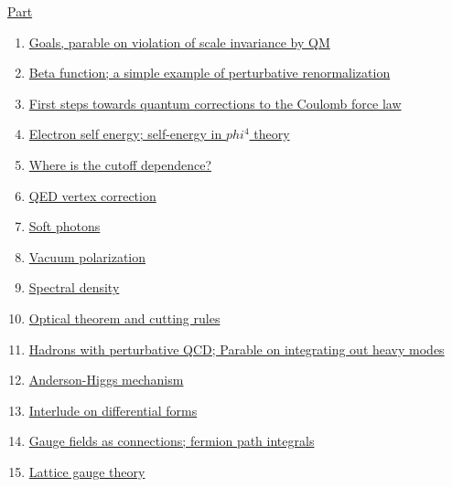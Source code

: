 \documentclass[11pt]{article}
\begin{document}
\newpage 

\begin{center}
	{\large  \href{https://mcgreevy.physics.ucsd.edu/w22/index.html}{Part }}
\end{center}

\vspace{-1cm}

\begin{enumerate}
	\item	\href{https://mp.weixin.qq.com/s/ru78J-IZJXysQjJwDxhlFw}{Goals, parable on violation of scale invariance by QM}	%
	\item	\href{https://mp.weixin.qq.com/s/bhjuN0b_kVqnEr30LZvUkQ}{Beta function; a simple example of perturbative renormalization}	%
	\item	\href{https://mp.weixin.qq.com/s/KhR06IsBpauLIerSNJc9rQ}{First steps towards quantum corrections to the Coulomb force law} 	%
	\item 	\href{https://mp.weixin.qq.com/s/ud2lzP8oh2rVSIzDwNTEBA}{Electron self energy; self-energy in $phi^4$ theory}	%
	\item 	\href{https://mp.weixin.qq.com/s/m4P7zEdt3mQNU9ZB_k2e3g}{Where is the cutoff dependence?}	%
	\item 	\href{https://mp.weixin.qq.com/s/KFOaX7ZTojfZZeQ1387RTQ}{QED vertex correction}	%
	\item 	\href{https://mp.weixin.qq.com/s/FnbXey2UBKU7yxsvNa7-_Q}{Soft photons}	%
	\item 	\href{https://mp.weixin.qq.com/s/2UmLcxSj9m7BzmwSHBl-5w}{Vacuum polarization}	%
	\item 	\href{https://mp.weixin.qq.com/s/d9mSq8lE13-R-efzX4GIYQ}{Spectral density}	%
	\item 	\href{https://mp.weixin.qq.com/s/C4UnSW0L4R_RVRK-fc_0Tg}{Optical theorem and cutting rules}	%
	\item	\href{https://mp.weixin.qq.com/s/RtFYMPZXyLQdyrMtvgUbxg}{Hadrons with perturbative QCD; Parable on integrating out heavy modes}	%
	\item	\href{https://mp.weixin.qq.com/s/LaWw7_pdUsP8xHBUhyXsFw}{Anderson-Higgs mechanism}	%
	\item	\href{https://mp.weixin.qq.com/s/OJB-cv0DnUyggDogCwL9DA}{Interlude on differential forms} 	%
	\item 	\href{https://mp.weixin.qq.com/s/hXthDRDDJ-QlMVdpBjaoNA}{Gauge fields as connections; fermion path integrals}	%
	\item 	\href{https://mp.weixin.qq.com/s/0l0YH6mKz2LnhBVuqfMY6g}{Lattice gauge theory}	%

\end{enumerate}
\end{document}
